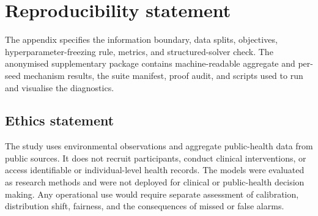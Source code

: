 \documentclass[twoside]{article}
\begin{document}



\clearpage
\appendix
\thispagestyle{empty}
\onecolumn
{}
\setcounter{table}{4}
\section*{Reproducibility statement}
The appendix specifies the information boundary, data splits, objectives, hyperparameter-freezing rule, metrics, and structured-solver check. The anonymised supplementary package contains machine-readable aggregate and per-seed mechanism results, the suite manifest, proof audit, and scripts used to run and visualise the diagnostics.

\subsection*{Ethics statement}
The study uses environmental observations and aggregate public-health data from public sources. It does not recruit participants, conduct clinical interventions, or access identifiable or individual-level health records. The models were evaluated as research methods and were not deployed for clinical or public-health decision making. Any operational use would require separate assessment of calibration, distribution shift, fairness, and the consequences of missed or false alarms.


\end{document}
